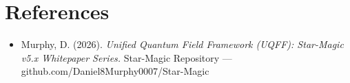 \documentclass[12pt,a4paper]{article}
\begin{document}
\section*{References}
\begin{itemize}
  \item[2.] Murphy, D. (2026). \emph{Unified Quantum Field Framework (UQFF): Star-Magic v5.x Whitepaper Series.} Star-Magic Repository --- github.com/Daniel8Murphy0007/Star-Magic
\end{itemize}

\end{document}
